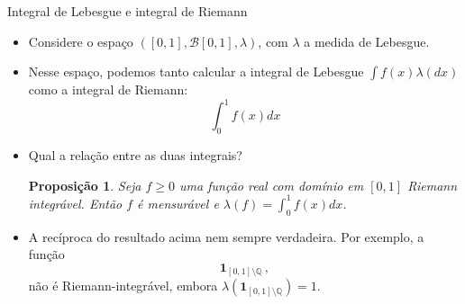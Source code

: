 \documentclass[11pt]{beamer}
\newtheorem{proposition}{Proposição}
\begin{document}
	\begin{frame}{Integral de Lebesgue e integral de Riemann}
		\begin{itemize}
			\item 	 Considere o espaço $([0,1], \mathcal{B}[0,1], \lambda)$, com $\lambda$ a medida de Lebesgue.
			\item Nesse espaço, podemos tanto calcular a integral de Lebesgue $\int f(x)\lambda(dx)$ como a integral de Riemann:
			$$\int_{0} ^1 f(x) dx$$
			\item Qual a relação entre as duas integrais?
			\begin{proposition}
				Seja $f\geq 0$ uma função real com domínio em $[0,1]$ Riemann integrável. Então $f$ é mensurável e $\lambda(f) = \int_0^1 f(x) dx$.
			\end{proposition}
			\item A recíproca do resultado acima nem sempre verdadeira. Por exemplo, a função
			$$\mathbf{1}_{[0,1]\setminus  \mathbb{Q}}\, ,$$
			não é Riemann-integrável, embora $\lambda(\mathbf{1}_{[0,1]\setminus  \mathbb{Q}}) = 1$.
		\end{itemize}

	\end{frame}
	
\end{document}

